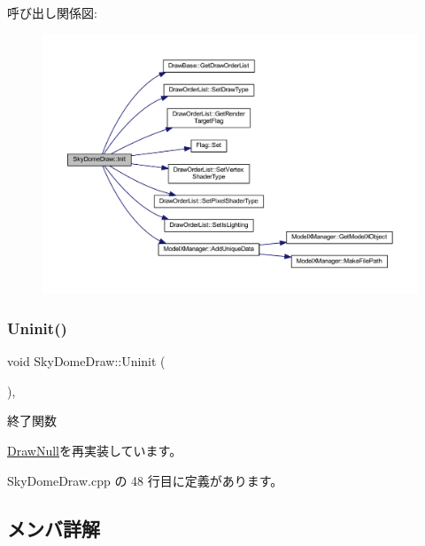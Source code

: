 呼び出し関係図\+:\nopagebreak
\begin{figure}[H]
\begin{center}
\leavevmode
\includegraphics[width=350pt]{class_sky_dome_draw_a5b82e8b650a20dbc0b7ed720d1fb7fab_cgraph}
\end{center}
\end{figure}
\mbox{\label{class_sky_dome_draw_aee1c6b102a97033073b2559b8c2c328b}} 
\subsubsection{\texorpdfstring{Uninit()}{Uninit()}}
{\footnotesize\ttfamily void Sky\+Dome\+Draw\+::\+Uninit (\begin{DoxyParamCaption}{ }\end{DoxyParamCaption})\hspace{0.3cm}{\ttfamily [override]}, {\ttfamily [virtual]}}



終了関数 



\mbox{\hyperlink{class_draw_null_a12d44e341c7364b5ab9cdd661dc16187}{Draw\+Null}}を再実装しています。



 Sky\+Dome\+Draw.\+cpp の 48 行目に定義があります。



\subsection{メンバ詳解}
\mbox{\label{class_sky_dome_draw_a366fd9d1040d77ddac71e335f10f2c29}} 

